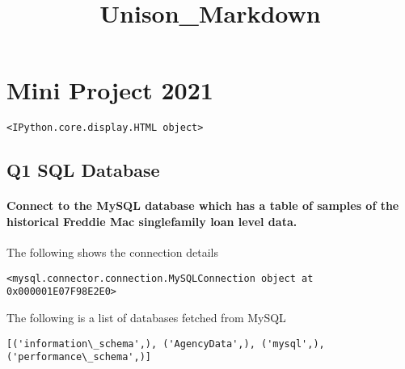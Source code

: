 \documentclass[11pt]{article}
\title{Unison\_Markdown}
\begin{document}
    
    \maketitle
    
    

    
    \hypertarget{mini-project-2021}{%
\section{Mini Project 2021}\label{mini-project-2021}}

            \begin{tcolorbox}[breakable, size=fbox, boxrule=.5pt, pad at break*=1mm, opacityfill=0]
\begin{Verbatim}[commandchars=\\\{\}]
<IPython.core.display.HTML object>
\end{Verbatim}
\end{tcolorbox}
        
    \hypertarget{q1-sql-database}{%
\subsection{Q1 SQL Database}\label{q1-sql-database}}

\hypertarget{connect-to-the-mysql-database-which-has-a-table-of-samples-of-the-historical-freddie-mac-singlefamily-loan-level-data.}{%
\paragraph{Connect to the MySQL database which has a table of samples of
the historical Freddie Mac singlefamily loan level
data.}\label{connect-to-the-mysql-database-which-has-a-table-of-samples-of-the-historical-freddie-mac-singlefamily-loan-level-data.}}

    The following shows the connection details

    \begin{Verbatim}[commandchars=\\\{\}]
<mysql.connector.connection.MySQLConnection object at 0x000001E07F98E2E0>
    \end{Verbatim}

    The following is a list of databases fetched from MySQL

    \begin{Verbatim}[commandchars=\\\{\}]
[('information\_schema',), ('AgencyData',), ('mysql',), ('performance\_schema',)]
    \end{Verbatim}
\end{document}
